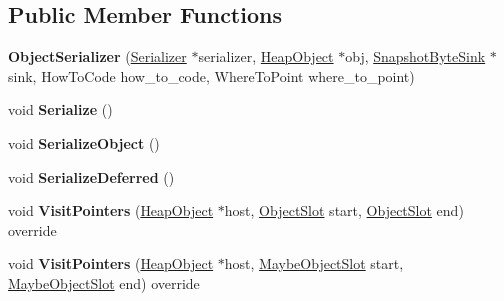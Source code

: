 \subsection*{Public Member Functions}
\begin{DoxyCompactItemize}
\item 
\mbox{\label{classv8_1_1internal_1_1Serializer_1_1ObjectSerializer_a8125b62ec7355cbc5b26389da3e112a0}} 
{\bfseries Object\+Serializer} (\mbox{\hyperlink{classv8_1_1internal_1_1Serializer}{Serializer}} $\ast$serializer, \mbox{\hyperlink{classv8_1_1internal_1_1HeapObject}{Heap\+Object}} $\ast$obj, \mbox{\hyperlink{classv8_1_1internal_1_1SnapshotByteSink}{Snapshot\+Byte\+Sink}} $\ast$sink, How\+To\+Code how\+\_\+to\+\_\+code, Where\+To\+Point where\+\_\+to\+\_\+point)
\item 
\mbox{\label{classv8_1_1internal_1_1Serializer_1_1ObjectSerializer_a828349a29e9fde5e7ddd3c32350c479a}} 
void {\bfseries Serialize} ()
\item 
\mbox{\label{classv8_1_1internal_1_1Serializer_1_1ObjectSerializer_a0abcc7d2448a3dfe6735d678038c5a9c}} 
void {\bfseries Serialize\+Object} ()
\item 
\mbox{\label{classv8_1_1internal_1_1Serializer_1_1ObjectSerializer_a38c2c0ae3537fe25ec45162aeb077664}} 
void {\bfseries Serialize\+Deferred} ()
\item 
\mbox{\label{classv8_1_1internal_1_1Serializer_1_1ObjectSerializer_abc26796d7de581a7b17ec6038c9c353c}} 
void {\bfseries Visit\+Pointers} (\mbox{\hyperlink{classv8_1_1internal_1_1HeapObject}{Heap\+Object}} $\ast$host, \mbox{\hyperlink{classv8_1_1internal_1_1ObjectSlot}{Object\+Slot}} start, \mbox{\hyperlink{classv8_1_1internal_1_1ObjectSlot}{Object\+Slot}} end) override
\item 
\mbox{\label{classv8_1_1internal_1_1Serializer_1_1ObjectSerializer_a3597dec3ba7b5b1bd652b208b451a572}} 
void {\bfseries Visit\+Pointers} (\mbox{\hyperlink{classv8_1_1internal_1_1HeapObject}{Heap\+Object}} $\ast$host, \mbox{\hyperlink{classv8_1_1internal_1_1MaybeObjectSlot}{Maybe\+Object\+Slot}} start, \mbox{\hyperlink{classv8_1_1internal_1_1MaybeObjectSlot}{Maybe\+Object\+Slot}} end) override

\end{DoxyCompactItemize}
